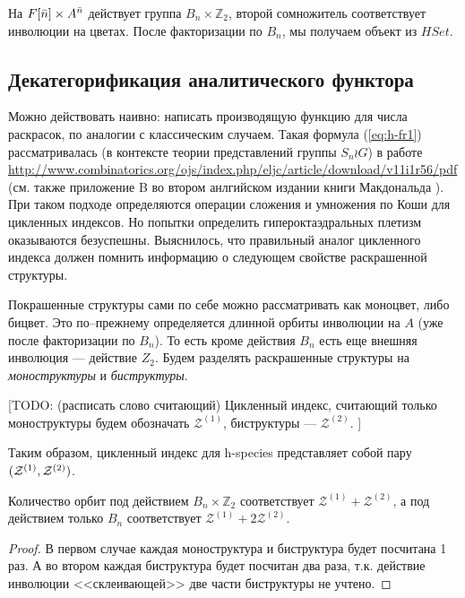На $F[\Bar n] \times A^{\Bar n}$ действует группа $B_n \times
\mathbb Z_2$, второй сомножитель соответствует инволюции на цветах. После
факторизации по $B_n$, мы получаем объект из $HSet$.



\subsection{Декатегорификация аналитического функтора} 
Можно действовать наивно: написать производящую функцию для числа раскрасок, по
аналогии с классическим случаем. Такая формула (\ref{eq:h-fr1}) рассматривалась
(в контексте теории представлений группы $S_n \wr G$) в работе
\url{http://www.combinatorics.org/ojs/index.php/eljc/article/download/v11i1r56/pdf}
(см. также приложение B во втором анлгийском издании книги Макдональда
\cite{Mac2}). При таком подходе определяются операции сложения и умножения
по Коши для цикленных индексов. Но попытки определить
гипероктаэдральных плетизм оказываются безуспешны. Выяснилось, что правильный аналог цикленного
индекса должен помнить информацию о следующем свойстве раскрашенной структуры.

Покрашенные структуры сами по себе можно рассматривать как моноцвет, либо
бицвет. Это по--прежнему определяется длинной орбиты инволюции на $A$ (уже
после факторизации по $B_n$). То есть кроме действия $B_n$ есть еще внешняя
инволюция --- действие $Z_2$. Будем разделять раскрашенные структуры на
\emph{моноструктуры} и \emph{биструктуры}.

[TODO: (расписать слово считающий) Цикленный индекс, считающий только
моноструктуры будем обозначать $\mathcal Z^{(1)}$, биструктуры --- $\mathcal Z^{(2)}$. ]

\begin{remark}
Таким образом, цикленный индекс для h-species представляет собой пару $(\mathcal Z^{(1)},
\mathcal Z^{(2)})$.
\end{remark}
\begin{statement}
Количество орбит под действием $B_n \times \mathbb Z_2$ соответствует $\mathcal
Z^{(1)} + \mathcal Z^{(2)}$, а под действием только $B_n$ соответствует $\mathcal Z^{(1)} + 2\mathcal
Z^{(2)}$. 
\end{statement}
\begin{proof}
В первом случае каждая моноструктура и биструктура будет посчитана 1 раз.
А во втором каждая биструктура будет посчитан два раза, т.к. действие инволюции
<<склеивающей>> две части биструктуры не учтено.
\end{proof}

